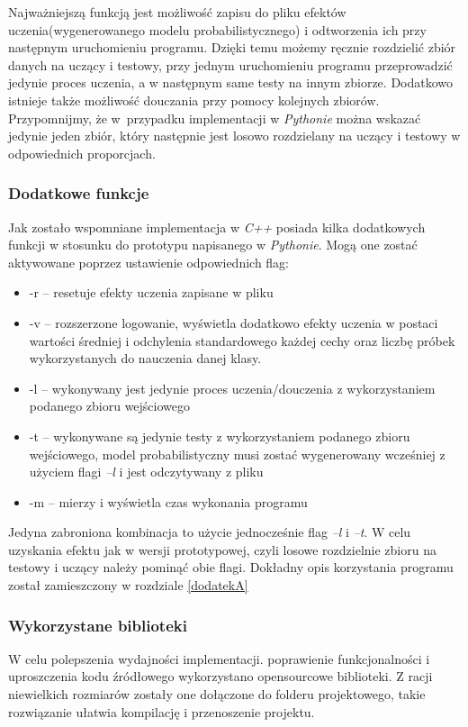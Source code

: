 Najważniejszą funkcją jest możliwość zapisu do pliku efektów uczenia(wygenerowanego modelu probabilistycznego) i odtworzenia ich przy następnym uruchomieniu programu. Dzięki temu możemy ręcznie rozdzielić zbiór danych na uczący i testowy, przy jednym uruchomieniu programu przeprowadzić jedynie proces uczenia, a w następnym same testy na innym zbiorze. Dodatkowo istnieje także możliwość douczania przy pomocy kolejnych zbiorów. Przypomnijmy, że w~przypadku implementacji w \textit{Pythonie} można wskazać jedynie jeden zbiór, który następnie jest losowo rozdzielany na uczący i testowy w odpowiednich proporcjach.

\subsubsection{Dodatkowe funkcje}

Jak zostało wspomniane implementacja w \textit{C++} posiada kilka dodatkowych funkcji w stosunku do prototypu napisanego w \textit{Pythonie}. Mogą one zostać aktywowane poprzez ustawienie odpowiednich flag:
\begin{itemize}
\item{-r -- resetuje efekty uczenia zapisane w pliku}
\item{-v -- rozszerzone logowanie, wyświetla dodatkowo efekty uczenia w postaci wartości średniej i odchylenia standardowego każdej cechy oraz liczbę próbek wykorzystanych do nauczenia danej klasy.}
\item{-l -- wykonywany jest jedynie proces uczenia/douczenia z wykorzystaniem podanego zbioru wejściowego}
\item{-t -- wykonywane są jedynie testy z wykorzystaniem podanego zbioru wejściowego, model probabilistyczny musi zostać wygenerowany wcześniej z użyciem flagi \textit{--l} i jest odczytywany z pliku} 
\item{-m -- mierzy i wyświetla czas wykonania programu}
\end{itemize}

Jedyna zabroniona kombinacja to użycie jednocześnie flag \textit{--l} i \textit{--t}. W celu uzyskania efektu jak w wersji prototypowej, czyli losowe rozdzielnie zbioru na testowy i uczący należy pominąć obie flagi. Dokładny opis korzystania programu został zamieszczony w rozdziale \ref{dodatekA}

\subsubsection{Wykorzystane biblioteki}
W celu polepszenia wydajności implementacji. poprawienie funkcjonalności i uproszczenia kodu źródłowego wykorzystano opensourcowe biblioteki. Z racji niewielkich rozmiarów zostały one dołączone do folderu projektowego, takie rozwiązanie ułatwia kompilację i przenoszenie projektu.

